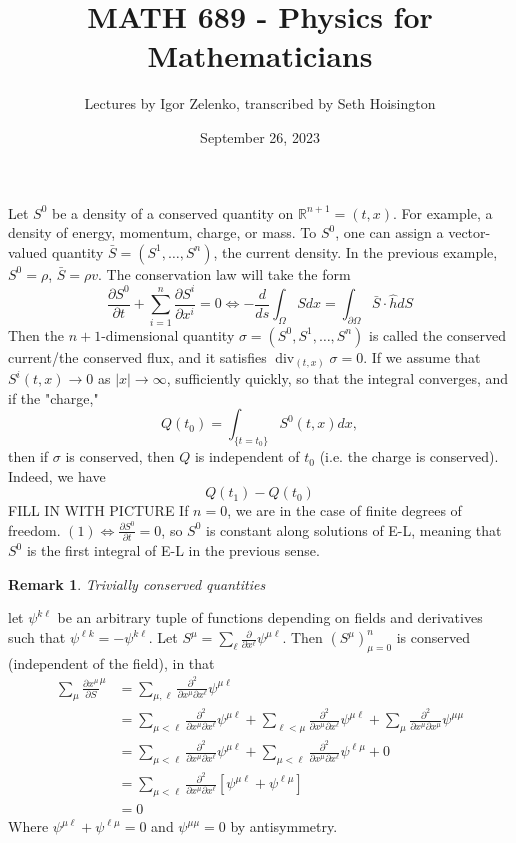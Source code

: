 \documentclass{article}
\title{MATH 689 - Physics for Mathematicians}
\author{Lectures by Igor Zelenko, transcribed by Seth Hoisington}
\date{September 26, 2023}
\newcommand{\R}{\mathbb R}
\newcommand{\nl}{\newline\newline\noindent}
\newcommand{\pd}[1]{\frac{\partial}{\partial #1}}
\newcommand{\pdof}[2]{\frac{\partial #1}{\partial #2}}
\DeclareMathOperator{\Div}{div}
\newtheorem{rk}{Remark}
\begin{document}
\maketitle

Let $S^0$ be a density of a conserved quantity on $\R^{n+1} = (t,x)$. For example, a density of energy, momentum, charge, or mass. To $S^0$, one can assign a vector-valued quantity $\bar S = (S^1,\dots, S^n)$, the current density. In the previous example, $S^0 = \rho$, $\bar S = \rho v$.
\nl
The conservation law will take the form
\[\pdof{ S^0}{t} + \sum_{i=1}^n \pdof{S^i}{x^i} = 0 \Leftrightarrow -\frac{d}{ds}\int_\Omega Sdx = \int_{\partial \Omega} \bar S\cdot \hat h dS\]
Then the $n+1$-dimensional quantity $\sigma = (S^0, S^1,\dots,S^n)$ is called the conserved current/the conserved flux, and it satisfies $\Div_{(t,x)}\sigma= 0$. If we assume that $S^i(t,x) \to 0$ as $|x| \to \infty$, sufficiently quickly, so that the integral converges, and if the "charge,"
\[Q(t_0) = \int_{\{t=t_0\}} S^0(t,x)dx,\]
then if $\sigma$ is conserved, then $Q$ is independent of $t_0$ (i.e. the charge is conserved).
\nl
Indeed, we have
\[Q(t_1) - Q(t_0)\]
FILL IN WITH PICTURE
\nl
If $n=0$, we are in the case of finite degrees of freedom. $(1)\Leftrightarrow \pdof{S^0}{t} = 0$, so $S^0$ is constant along solutions of E-L, meaning that $S^0$ is the first integral of E-L in the previous sense.
\nl
\begin{rk}
    Trivially conserved quantities
\end{rk}
let $\psi^{k\ell}$ be an arbitrary tuple of functions depending on fields and derivatives such that $\psi^{\ell k} =- \psi^{k\ell}$. Let $S^\mu = \sum_{\ell}\pd{x^\ell}\psi^{\mu\ell}$. Then $(S^\mu)_{\mu = 0}^n$ is conserved (independent of the field), in that
\begin{align*}
    \sum_{\mu}\pdof{x^\mu}S^\mu &= \sum_{\mu,\ell}\frac{\partial^2}{\partial x^\mu \partial x^\ell}\psi^{\mu\ell}\\
    &=\sum_{\mu<\ell}\frac{\partial^2}{\partial x^\mu \partial x^\ell}\psi^{\mu\ell} + \sum_{\ell<\mu}\frac{\partial^2}{\partial x^\mu \partial x^\ell}\psi^{\mu\ell}+\sum_{\mu}\frac{\partial^2}{\partial x^\mu \partial x^\mu}\psi^{\mu\mu}\\
    &=\sum_{\mu<\ell}\frac{\partial^2}{\partial x^\mu \partial x^\ell}\psi^{\mu\ell} + \sum_{\mu<\ell}\frac{\partial^2}{\partial x^\mu \partial x^\ell}\psi^{\ell\mu}+0\\
    &=\sum_{\mu<\ell}\frac{\partial^2}{\partial x^\mu \partial x^\ell}\left[\psi^{\mu\ell} + \psi^{\ell\mu}\right]\\
    &=0
\end{align*}
Where $\psi^{\mu\ell} + \psi^{\ell\mu} = 0$ and $\psi^{\mu\mu} = 0$ by antisymmetry.
\end{document}
